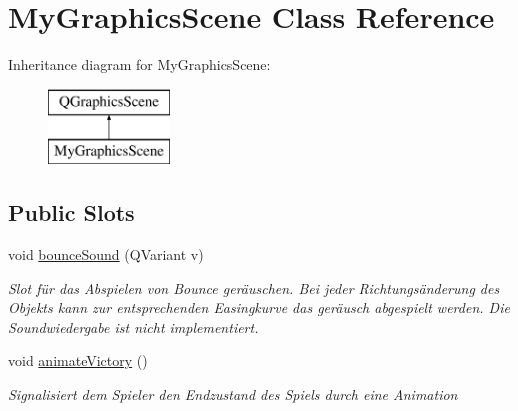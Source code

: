 \hypertarget{class_my_graphics_scene}{\section{My\-Graphics\-Scene Class Reference}
\label{class_my_graphics_scene}
}
Inheritance diagram for My\-Graphics\-Scene\-:\begin{figure}[H]
\begin{center}
\leavevmode
\includegraphics[height=2.000000cm]{class_my_graphics_scene}
\end{center}
\end{figure}
\subsection*{Public Slots}
\begin{DoxyCompactItemize}
\item 
void \hyperlink{class_my_graphics_scene_ae13be07253c9d3ff11c336c09cd89daf}{bounce\-Sound} (Q\-Variant v)
\begin{DoxyCompactList}\small\item\em Slot für das Abspielen von Bounce geräuschen. Bei jeder Richtungsänderung des Objekts kann zur entsprechenden Easingkurve das geräusch abgespielt werden. Die Soundwiedergabe ist nicht implementiert. \end{DoxyCompactList}\item 
void \hyperlink{class_my_graphics_scene_a47693d863886396ee37b3bec05ac341f}{animate\-Victory} ()
\begin{DoxyCompactList}\small\item\em Signalisiert dem Spieler den Endzustand des Spiels durch eine Animation \end{DoxyCompactList}\end{DoxyCompactItemize}
